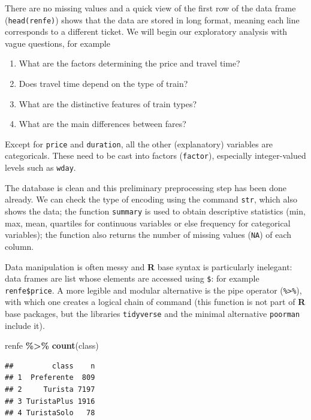 \documentclass[
  11pt,
  letterpaper,
]{book}
\newenvironment{Shaded}{\begin{snugshade}}{\end{snugshade}}
\newcommand{\KeywordTok}[1]{\textcolor[rgb]{0.13,0.29,0.53}{\textbf{#1}}}
\newcommand{\NormalTok}[1]{#1}
\newcommand{\OperatorTok}[1]{\textcolor[rgb]{0.81,0.36,0.00}{\textbf{#1}}}
\newcommand{\StringTok}[1]{\textcolor[rgb]{0.31,0.60,0.02}{#1}}
\providecommand{\tightlist}{%
  \setlength{\itemsep}{0pt}\setlength{\parskip}{0pt}}
\theoremstyle{definition}
\theoremstyle{definition}
\theoremstyle{definition}
\theoremstyle{remark}
\begin{document}
There are no missing values and a quick view of the first row of the data frame (\texttt{head(renfe)}) shows that the data are stored in long format, meaning each line corresponds to a different ticket. We will begin our exploratory analysis with vague questions, for example

\begin{enumerate}
\def\labelenumi{\arabic{enumi}.}
\tightlist
\item
  What are the factors determining the price and travel time?
\item
  Does travel time depend on the type of train?
\item
  What are the distinctive features of train types?
\item
  What are the main differences between fares?
\end{enumerate}

Except for \texttt{price} and \texttt{duration}, all the other (explanatory) variables are categoricals. These need to be cast into factors (\texttt{factor}), especially integer-valued levels such as \texttt{wday}.

The database is clean and this preliminary preprocessing step has been done already. We can check the type of encoding using the command \texttt{str}, which also shows the data; the function \texttt{summary} is used to obtain descriptive statistics (min, max, mean, quartiles for continuous variables or else frequency for categorical variables); the function also returns the number of missing values (\texttt{NA}) of each column.

Data manipulation is often messy and \textbf{R} base syntax is particularly inelegant: data frames are list whose elements are accessed using \texttt{\$}: for example \texttt{renfe\$price}. A more legible and modular alternative is the pipe operator (\texttt{\%\textgreater{}\%}), with which one creates a logical chain of command (this function is not part of \textbf{R} base packages, but the libraries \texttt{tidyverse} and the minimal alternative \texttt{poorman} include it).

\begin{Shaded}
\begin{Highlighting}[]
\NormalTok{renfe }\OperatorTok{\%\textgreater{}\%}\StringTok{ }\KeywordTok{count}\NormalTok{(class)}
\end{Highlighting}
\end{Shaded}

\begin{verbatim}
##         class    n
## 1  Preferente  809
## 2     Turista 7197
## 3 TuristaPlus 1916
## 4 TuristaSolo   78
\end{verbatim}
\end{document}
